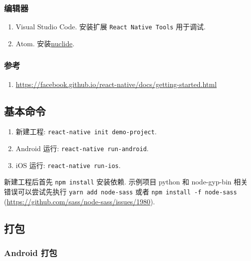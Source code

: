 \subsubsection{编辑器}\label{ux7f16ux8f91ux5668}

\begin{enumerate}
\def\labelenumi{\arabic{enumi}.}
\tightlist
\item
  Visual Studio Code. 安装扩展 \lstinline!React Native Tools! 用于调试.
\item
  Atom. 安装\href{https://atom.io/packages/nuclide}{nuclide}.
\end{enumerate}

\subsubsection{参考}\label{ux53c2ux8003}

\begin{enumerate}
\def\labelenumi{\arabic{enumi}.}
\tightlist
\item
  \url{https://facebook.github.io/react-native/docs/getting-started.html}
\end{enumerate}

\subsection{基本命令}\label{ux57faux672cux547dux4ee4}

\begin{enumerate}
\def\labelenumi{\arabic{enumi}.}
\tightlist
\item
  新建工程: \lstinline!react-native init demo-project!.
\item
  Android 运行: \lstinline!react-native run-android!.
\item
  iOS 运行: \lstinline!react-native run-ios!.
\end{enumerate}

新建工程后首先 \lstinline!npm install! 安装依赖. 示例项目 python 和
node-gyp-bin 相关错误可以尝试先执行 \lstinline!yarn add node-sass! 或者
\lstinline!npm install -f node-sass!
(\url{https://github.com/sass/node-sass/issues/1980}).

\subsection{打包}\label{ux6253ux5305}

\subsubsection{Android 打包}\label{android-ux6253ux5305}

